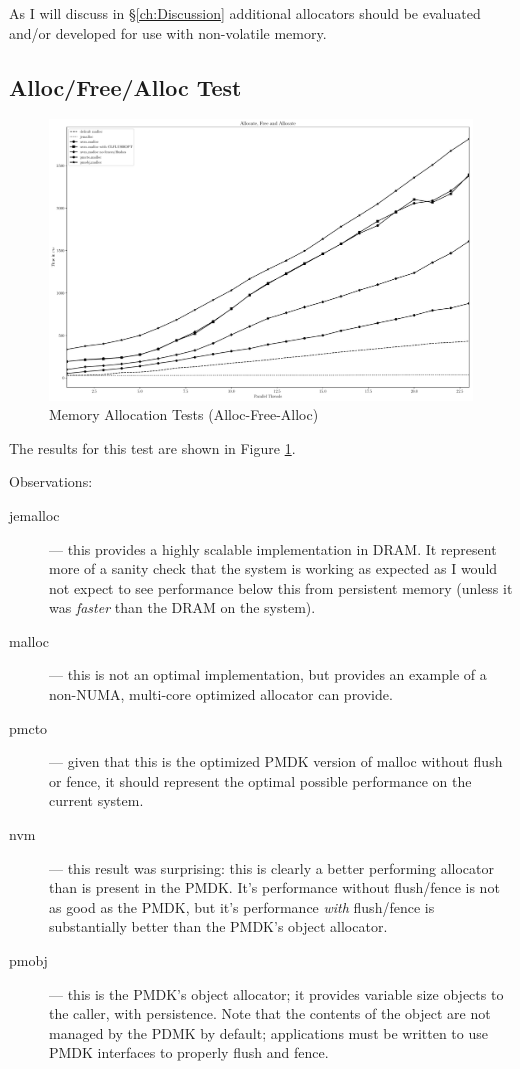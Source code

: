 As I will discuss in \S \ref{ch:Discussion} additional
allocators should be evaluated and/or developed for use with
non-volatile memory.

\subsection{Alloc/Free/Alloc Test}\label{section:results:malloc:afa}
\begin{figure}
    \centering
    \caption{Memory Allocation Tests (Alloc-Free-Alloc)}\label{plot:afa}
    \includegraphics[scale=0.35]{malloc/alloc_free_alloc.pdf}
\end{figure}

The results for this test are shown in Figure \ref{plot:afa}.

Observations:

\begin{description}
    \item[jemalloc] --- this provides a highly scalable implementation in DRAM.  It represent more of a sanity check that the system is working as expected as I would not expect to see performance below this from persistent memory (unless it was \textit{faster} than the DRAM on the system).
    \item[malloc] --- this is not an optimal implementation, but provides an example of a non-NUMA, multi-core optimized allocator can provide.
    \item[pmcto] --- given that this is the optimized \acs{PMDK} version of malloc without flush or fence, it should represent the optimal possible performance on the current system.
    \item[nvm] --- this result was surprising: this is clearly a better performing allocator than is present in the PMDK. It's performance without flush/fence is not as good as the PMDK, but it's performance \textit{with} flush/fence is substantially better than the PMDK's object allocator.
    \item[pmobj] --- this is the PMDK's object allocator; it provides variable size objects to the caller, with persistence.  Note that the contents of the object are not managed by the PDMK by default; applications must be written to use PMDK interfaces to properly flush and fence.     
\end{description}

